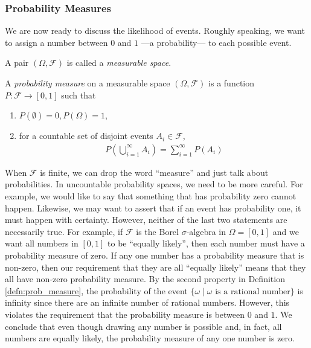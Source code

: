 \documentclass[\topdir/lecture\_notes.tex]{subfiles}
\begin{document}
\subsubsection*{Probability Measures}
We are now ready to discuss the likelihood of events. Roughly speaking, we want to assign a number between \(0\) and \(1\) ---a probability--- to each possible event. 
\begin{defn}
A pair \((\Omega, \mathcal{F})\) is called a \emph{measurable space}.
\end{defn}
\begin{defn}\label{defn:prob_measure}
A \emph{probability measure} on a measurable space \((\Omega, \mathcal{F})\) is a function \(P: \mathcal{F} \rightarrow[0,1]\) such that
\begin{enumerate}
  \item \(P(\emptyset)=0, P(\Omega)=1\),
  \item for a countable set of disjoint events \(A_{i} \in \mathcal{F}\),
    \begin{align*}
        P\left(\bigcup_{i=1}^{\infty} A_{i}\right)=\sum_{i=1}^{\infty} P(A_{i})
    \end{align*}
\end{enumerate}
\end{defn}

When \(\mathcal{F}\) is finite, we can drop the word ``measure'' and just talk about probabilities. In uncountable probability spaces, we need to be more careful. For example, we would like to say that something that has probability zero cannot happen. Likewise, we may want to assert that if an event has probability one, it must happen with certainty. However, neither of the last two statements are necessarily true. For example, if \(\mathcal{F}\) is the Borel \(\sigma\)-algebra in \(\Omega = [0,1]\) and we want all numbers in \([0,1]\) to be ``equally likely'', then each number must have a probability measure of zero. If any one number has a probability measure that is non-zero, then our requirement that they are all ``equally likely'' means that they all have non-zero probability measure. By the second property in Definition \ref{defn:prob_measure}, the probability of the event \(\{\omega \mid \omega \text{ is a rational number}\}\) is infinity since there are an infinite number of rational numbers. However, this violates the requirement that the probability measure is between \(0\) and \(1\). We conclude that even though drawing any number is possible and, in fact, all numbers are equally likely, the probability measure of any one number is zero.
\end{document}
